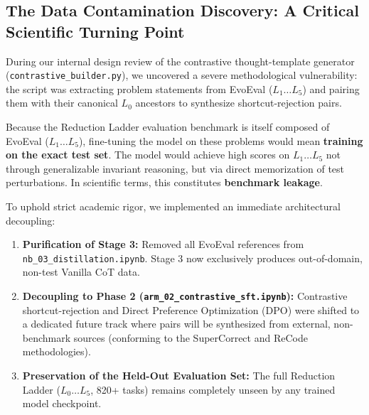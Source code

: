 \documentclass[12pt, a4paper]{article}
\begin{document}
\subsection{The Data Contamination Discovery: A Critical Scientific Turning Point}

\begin{gapbox}
During our internal design review of the contrastive thought-template generator (\texttt{contrastive\_builder.py}), we uncovered a severe methodological vulnerability: the script was extracting problem statements from EvoEval ($L_1 \dots L_5$) and pairing them with their canonical $L_0$ ancestors to synthesize shortcut-rejection pairs.

Because the Reduction Ladder evaluation benchmark is itself composed of EvoEval ($L_1 \dots L_5$), fine-tuning the model on these problems would mean \textbf{training on the exact test set}. The model would achieve high scores on $L_1 \dots L_5$ not through generalizable invariant reasoning, but via direct memorization of test perturbations. In scientific terms, this constitutes \textbf{benchmark leakage}.
\end{gapbox}

\begin{noveltybox}
To uphold strict academic rigor, we implemented an immediate architectural decoupling:
\begin{enumerate}[leftmargin=*]
  \item \textbf{Purification of Stage 3:} Removed all EvoEval references from \texttt{nb\_03\_distillation.ipynb}. Stage 3 now exclusively produces out-of-domain, non-test Vanilla CoT data.
  \item \textbf{Decoupling to Phase 2 (\texttt{arm\_02\_contrastive\_sft.ipynb}):} Contrastive shortcut-rejection and Direct Preference Optimization (DPO) were shifted to a dedicated future track where pairs will be synthesized from external, non-benchmark sources (conforming to the SuperCorrect \cite{supercorrect} and ReCode \cite{recode_contrastive} methodologies).
  \item \textbf{Preservation of the Held-Out Evaluation Set:} The full Reduction Ladder ($L_0 \dots L_5$, 820+ tasks) remains completely unseen by any trained model checkpoint.
\end{enumerate}
\end{noveltybox}

\end{document}
